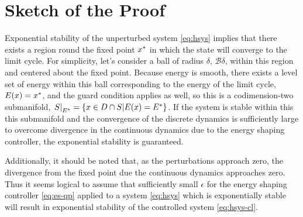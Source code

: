 \documentclass[twocolumn]{article}
\begin{document}
\section{Sketch of the Proof}

Exponential stability of the unperturbed system \eqref{eq:hsys} implies that there exists a region round the fixed point $x^{*}$ in which the state will converge to the limit cycle.
%
For simplicity, let's consider a ball of radius $\delta$, $\mathcal{B}\delta$, within this region and centered about the fixed point.
%
Because energy is smooth, there exists a level set of energy within this ball corresponding to the energy of the limit cycle, $E(x) = x^{*}$, and the guard condition applies as well, so this is a codimension-two submanifold, $\left.S\right|_{E^{*}} = \{ x \in D \cap S | E(x) = E^{*} \}$.
%
If the system is stable within this this submanifold and the convergence of the discrete dynamics is sufficiently large to overcome divergence in the continuous dynamics due to the energy shaping controller, the exponential stability is guaranteed.


Additionally, it should be noted that, as the perturbations approach zero, the divergence from the fixed point due the continuous dynamics approaches zero.
%
Thus it seems logical to assume that sufficiently small $\epsilon$ for the energy shaping controller \eqref{eq:es-qp} applied to a system \eqref{eq:hsys} which is exponentially stable will result in exponential stability of the controlled system \eqref{eq:hsys-cl}.
\end{document}
